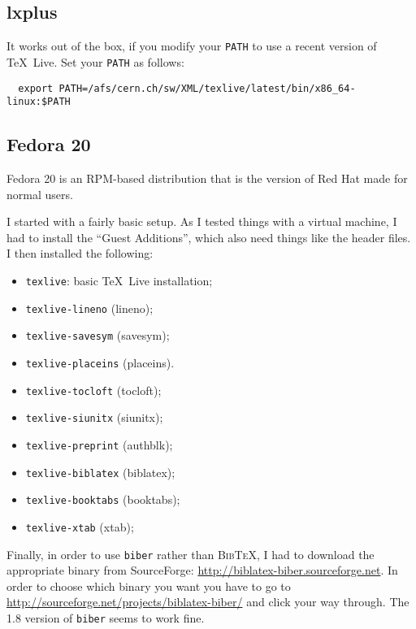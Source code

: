 \documentclass[atlasstyle,UKenglish]{latex/atlasdoc}
\newcommand{\BibTeX}{\textsc{Bib\TeX}}
\newcommand{\Package}[1]{\texttt{#1}\xspace}
\begin{document}
\subsection{lxplus} 

It works out of the box, if you modify your \texttt{PATH} to use a recent version of \TeX\ Live.
Set your \texttt{PATH} as follows:
\begin{verbatim}
  export PATH=/afs/cern.ch/sw/XML/texlive/latest/bin/x86_64-linux:$PATH
\end{verbatim}


\subsection{Fedora 20} 

Fedora 20 is an RPM-based distribution that is the version of Red Hat made for normal users.

I started with a fairly basic setup.
As I tested things with a virtual machine, I had to install the \enquote{Guest Additions},
which also need things like the header files.
I then installed the following:
\begin{itemize}\setlength{\parskip}{0pt}\setlength{\itemsep}{0pt}
\item \Package{texlive}: basic \TeX\ Live installation;
\item \Package{texlive-lineno} (lineno);
\item \Package{texlive-savesym} (savesym);
\item \Package{texlive-placeins} (placeins).
\item \Package{texlive-tocloft} (tocloft);
\item \Package{texlive-siunitx} (siunitx);
\item \Package{texlive-preprint} (authblk);
\item \Package{texlive-biblatex} (biblatex);
\item \Package{texlive-booktabs} (booktabs);
\item \Package{texlive-xtab} (xtab);
\end{itemize}

Finally, in order to use \Package{biber} rather than \BibTeX,
I had to download the appropriate binary from SourceForge:
\url{http://biblatex-biber.sourceforge.net}.
In order to choose which binary you want you have to go to
\url{http://sourceforge.net/projects/biblatex-biber/} and click your way through.
The 1.8 version of \Package{biber} seems to work fine.
\end{document}
